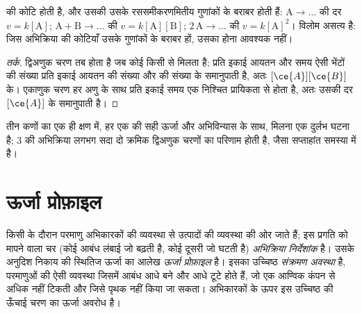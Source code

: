 \begin{proposition}[मूल चरण का दर नियम]\label{prop:b1:elementary-steps:elementary-law}
 की कोटि होती है, और उसकी  उसके
रससमीकरणमितीय गुणांकों के बराबर होती हैं: $\mathrm{A} \to \dots$ की दर $v = k[\mathrm{A}]$;
$\mathrm{A} + \mathrm{B} \to \dots$ की $v = k[\mathrm{A}][\mathrm{B}]$;
$2\,\mathrm{A} \to \dots$ की $v = k[\mathrm{A}]^2$। विलोम असत्य है:
जिस अभिक्रिया की कोटियाँ उसके गुणांकों के बराबर हों, उसका  होना आवश्यक नहीं।
\end{proposition}

\begin{proof}[तर्क]
द्विअणुक चरण तब होता है जब कोई  किसी  से मिलता है; प्रति इकाई आयतन
और समय ऐसी भेंटों की संख्या प्रति इकाई आयतन  की संख्या
और  की संख्या के समानुपाती है, अतः
$[\ce{A}][\ce{B}]$ के। एकाणुक चरण हर अणु के साथ प्रति इकाई समय एक
निश्चित प्रायिकता से होता है, अतः उसकी दर $[\ce{A}]$ के समानुपाती है।
\end{proof}

\begin{remark}[आण्विकता शायद ही दो से अधिक क्यों होती है]\label{rem:b1:elementary-steps:termolecular}
तीन कणों का एक ही क्षण में, हर एक की सही ऊर्जा
और अभिविन्यास के साथ, मिलना एक दुर्लभ घटना है;  3 की अभिक्रिया लगभग
सदा दो क्रमिक द्विअणुक चरणों का परिणाम होती है, जैसा
सप्ताहांत समस्या में है।
\end{remark}

\section{ऊर्जा प्रोफ़ाइल}

\begin{definition}\label{def:b1:elementary-steps:energy-profile}
किसी  के दौरान परमाणु अभिकारकों की व्यवस्था से
उत्पादों की व्यवस्था की ओर जाते हैं; इस प्रगति को मापने वाला चर
(कोई आबंध लंबाई जो बढ़ती है, कोई दूसरी जो घटती है) \emph{अभिक्रिया
निर्देशांक} है। उसके अनुदिश निकाय की स्थितिज ऊर्जा
का आलेख \emph{ऊर्जा प्रोफ़ाइल} है।
इसका उच्चिष्ठ \emph{संक्रमण अवस्था} है,
परमाणुओं की ऐसी व्यवस्था जिसमें आबंध आधे बने और
आधे टूटे होते हैं, जो एक आण्विक कंपन से अधिक नहीं टिकती और जिसे
पृथक नहीं किया जा सकता। अभिकारकों के ऊपर इस उच्चिष्ठ की ऊँचाई चरण का
ऊर्जा अवरोध है।
\end{definition}


